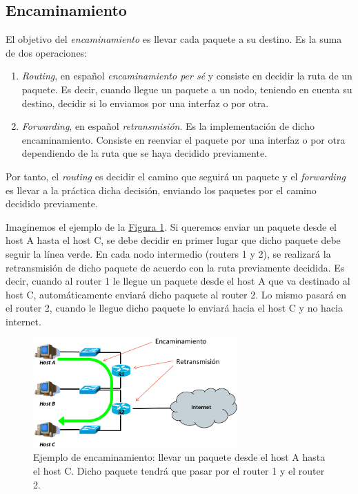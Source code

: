 \documentclass[10pt,a4paper,spanish]{report}
\begin{document}
\subsection{\textcolor{tema4}Encaminamiento}
El objetivo del \textit{\textcolor{tema4}{encaminamiento}} es llevar cada paquete a su destino. Es la suma de dos operaciones:
\begin{enumerate}[\color{tema4}{$\clubsuit$}]
  \item \textit{\textcolor{tema4}{Routing}}, en español \textit{\textcolor{tema4}{encaminamiento per sé}} y consiste en decidir la ruta de un paquete. Es decir, cuando llegue un paquete a un nodo, teniendo en cuenta su destino, decidir si lo enviamos por una interfaz o por otra.
  \item \textit{\textcolor{tema4}{Forwarding}}, en español \textit{\textcolor{tema4}{retransmisión}}. Es la implementación de dicho encaminamiento. Consiste en reenviar el paquete por una interfaz o por otra dependiendo de la ruta que se haya decidido previamente.
\end{enumerate}

Por tanto, el \textit{\textcolor{tema4}{routing}} es decidir el camino que seguirá un paquete y el \textit{\textcolor{tema4}{forwarding}} es llevar a la práctica dicha decisión, enviando los paquetes por el camino decidido previamente.

Imaginemos el ejemplo de la \hyperref[ej_encaminamiento]{Figura \ref*{ej_encaminamiento}}. Si queremos enviar un paquete desde el host A hasta el host C, se debe decidir en primer lugar que dicho paquete debe seguir la línea verde. En cada nodo intermedio (routers 1 y 2), se realizará la retransmisión de dicho paquete de acuerdo con la ruta previamente decidida. Es decir, cuando al router 1 le llegue un paquete desde el host A que va destinado al host C, automáticamente enviará dicho paquete al router 2. Lo mismo pasará en el router 2, cuando le llegue dicho paquete lo enviará hacia el host C y no hacia internet.

\begin{figure}[!h]
  \centering
  \includegraphics[width=0.7\textwidth]{ejemplo_encaminamiento}
  \caption{Ejemplo de encaminamiento: llevar un paquete desde el host A hasta el host C. Dicho paquete tendrá que pasar por el router 1 y el router 2.}
  \label{ej_encaminamiento}
\end{figure}
\end{document}
